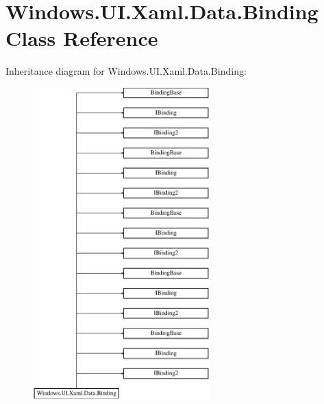\hypertarget{class_windows_1_1_u_i_1_1_xaml_1_1_data_1_1_binding}{}\section{Windows.\+U\+I.\+Xaml.\+Data.\+Binding Class Reference}
\label{class_windows_1_1_u_i_1_1_xaml_1_1_data_1_1_binding}
Inheritance diagram for Windows.\+U\+I.\+Xaml.\+Data.\+Binding\+:\begin{figure}[H]
\begin{center}
\leavevmode
\includegraphics[height=12.000000cm]{class_windows_1_1_u_i_1_1_xaml_1_1_data_1_1_binding}
\end{center}
\end{figure}
